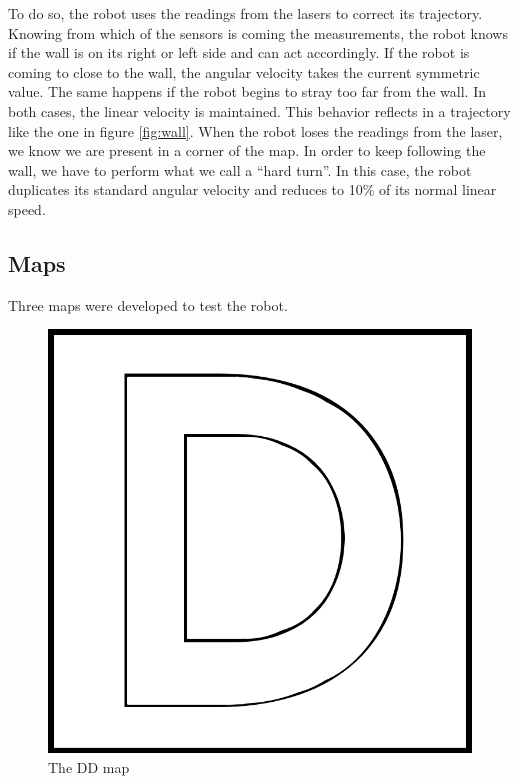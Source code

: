 \documentclass[10pt,journal,compsoc]{IEEEtran}
\begin{document}
To do so, the robot uses the readings from the lasers to correct its trajectory. Knowing from which of the sensors is coming the measurements, the robot knows if the wall is on its right or left side and can act accordingly. If the robot is coming to close to the wall, the angular velocity takes the current symmetric value. The same happens if the robot begins to stray too far from the wall. In both cases, the linear velocity is maintained. This behavior reflects in a trajectory like the one in figure \ref{fig:wall}. When the robot loses the readings from the laser, we know we are present in a corner of the map. In order to keep following the wall, we have to perform what we call a ``hard turn''. In this case, the robot duplicates its standard angular velocity and reduces to 10\% of its normal linear speed.

\subsection{Maps}
Three maps were developed to test the robot. 

   \begin{figure}[thpb]
      \centering
     \includegraphics[scale=0.2]{img/DD.png}
      \caption{The DD map}
      \label{fig:DD_map}
   \end{figure}
   
\end{document}
